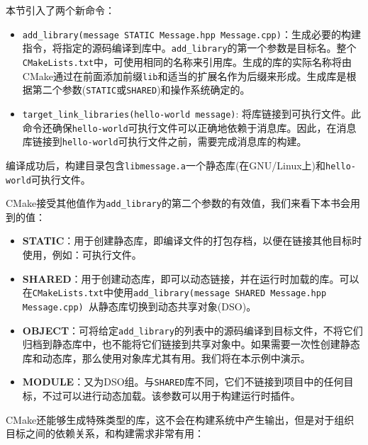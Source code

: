 
本节引入了两个新命令：

\begin{itemize}
\item \texttt{add\_library(message STATIC Message.hpp Message.cpp)}：生成必要的构建指令，将指定的源码编译到库中。\texttt{add\_library}的第一个参数是目标名。整个\texttt{CMakeLists.txt}中，可使用相同的名称来引用库。生成的库的实际名称将由CMake通过在前面添加前缀\texttt{lib}和适当的扩展名作为后缀来形成。生成库是根据第二个参数(\texttt{STATIC}或\texttt{SHARED})和操作系统确定的。

\item \texttt{target\_link\_libraries(hello-world message)}: 将库链接到可执行文件。此命令还确保\texttt{hello-world}可执行文件可以正确地依赖于消息库。因此，在消息库链接到\texttt{hello-world}可执行文件之前，需要完成消息库的构建。

\end{itemize}

编译成功后，构建目录包含\texttt{libmessage.a}一个静态库(在GNU/Linux上)和\texttt{hello-world}可执行文件。

CMake接受其他值作为\texttt{add\_library}的第二个参数的有效值，我们来看下本书会用到的值：

\begin{itemize}
\item \textbf{STATIC}：用于创建静态库，即编译文件的打包存档，以便在链接其他目标时使用，例如：可执行文件。

\item \textbf{SHARED}：用于创建动态库，即可以动态链接，并在运行时加载的库。可以在\texttt{CMakeLists.txt}中使用\texttt{add\_library(message SHARED Message.hpp Message.cpp) }从静态库切换到动态共享对象(DSO)。

\item \textbf{OBJECT}：可将给定\texttt{add\_library}的列表中的源码编译到目标文件，不将它们归档到静态库中，也不能将它们链接到共享对象中。如果需要一次性创建静态库和动态库，那么使用对象库尤其有用。我们将在本示例中演示。

\item \textbf{MODULE}：又为DSO组。与\texttt{SHARED}库不同，它们不链接到项目中的任何目标，不过可以进行动态加载。该参数可以用于构建运行时插件。

\end{itemize}

CMake还能够生成特殊类型的库，这不会在构建系统中产生输出，但是对于组织目标之间的依赖关系，和构建需求非常有用：

